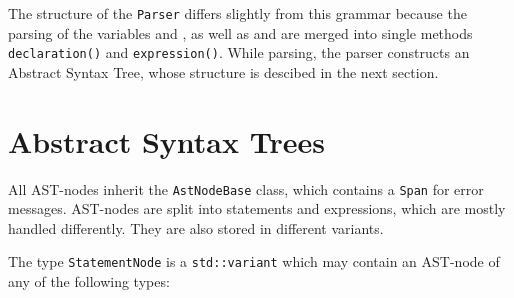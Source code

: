 \documentclass[a4paper]{article}
\newcommand*{\code}[1]{\texttt{#1}}
\begin{document}
The structure of the \code{Parser} differs slightly from this grammar 
because the parsing of the variables  and , as well 
as  and  are merged into single 
methods \code{declaration()} and \code{expression()}.
While parsing, the parser constructs an Abstract Syntax Tree, 
whose structure is descibed in the next section.

\clearpage
\section{Abstract Syntax Trees}
\label{sect:AST}

All AST-nodes inherit the \code{AstNodeBase} class, which contains 
a \code{Span} for error messages. AST-nodes are split into 
statements and expressions, which are mostly handled differently.
They are also stored in different variants.

The type \code{StatementNode} is a 
\code{std::variant} which may contain an AST-node of any of the 
following types:
\end{document}
